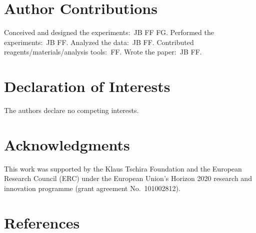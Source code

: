\documentclass[
  twocolumn]{biophys-new-mod}
\begin{document}
\hypertarget{author-contributions}{%
\section{Author Contributions}\label{author-contributions}}

Conceived and designed the experiments:~JB FF FG. Performed the
experiments:~JB FF. Analyzed the data:~JB FF. Contributed
reagents/materials/analysis tools:~FF. Wrote the paper:~JB FF.

\hypertarget{declaration-of-interests}{%
\section{Declaration of Interests}\label{declaration-of-interests}}

The authors declare no competing interests.

\hypertarget{acknowledgments}{%
\section{Acknowledgments}\label{acknowledgments}}

This work was supported by the Klaus Tschira Foundation and the European
Research Council (ERC) under the European Union's Horizon 2020 research
and innovation programme (grant agreement No.~101002812).

\hypertarget{references}{%
\section{References}\label{references}}
\end{document}

